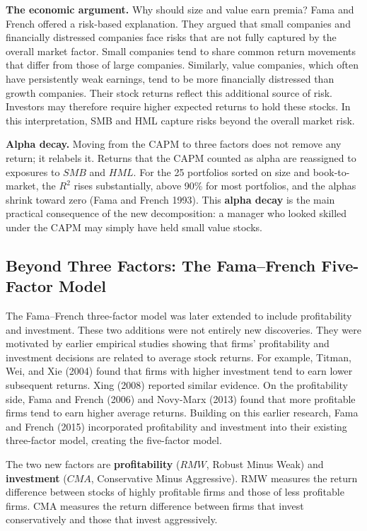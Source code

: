 \textbf{The economic argument.} Why should size and value earn premia? 
Fama and French offered a risk-based explanation. They argued that small companies and financially distressed companies face risks that are not fully captured by the overall market factor. Small companies tend to share common return movements that differ from those of large companies. Similarly, value companies, which often have persistently weak earnings, tend to be more financially distressed than growth companies. Their stock returns reflect this additional source of risk. Investors may therefore require higher expected returns to hold these stocks. In this interpretation, SMB and HML capture risks beyond the overall market risk.

\textbf{Alpha decay.} Moving from the CAPM to three factors does not remove any return; it relabels it. Returns that the CAPM counted as alpha are reassigned to exposures to $SMB$ and $HML$. For the 25 portfolios sorted on size and book-to-market, the $R^2$ rises substantially, above 90\% for most portfolios, and the alphas shrink toward zero (Fama and French 1993). This \textbf{alpha decay} is the main practical consequence of the new decomposition: a manager who looked skilled under the CAPM may simply have held small value stocks.


\subsection{Beyond Three Factors: The Fama--French Five-Factor Model}
\label{sec:03-multifactor}

The Fama--French three-factor model was later extended to include profitability and investment. These two additions were not entirely new
discoveries. They were motivated by earlier empirical studies showing that firms' profitability and investment decisions are related to
average stock returns. For example, Titman, Wei, and Xie (2004) found that firms with higher investment tend to earn lower subsequent
returns. Xing (2008) reported similar evidence. On the profitability side, Fama and French (2006) and Novy-Marx (2013) found that more
profitable firms tend to earn higher average returns. Building on this earlier research, Fama and French (2015) incorporated profitability
and investment into their existing three-factor model, creating the five-factor model.

The two new factors are \textbf{profitability}  ($RMW$, Robust Minus Weak) and
\textbf{investment} ($CMA$, Conservative Minus Aggressive). RMW measures the return difference between stocks of
highly profitable firms and those of less profitable firms. CMA measures the return difference between firms that invest conservatively
and those that invest aggressively. 

